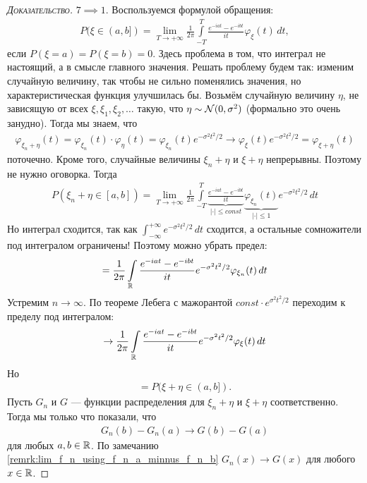 \documentclass[../main.tex]{subfiles}
\begin{document}
\begin{proof}[\normalfont\textsc{Доказательство}]
 $ 7 \implies 1 $. Воспользуемся формулой обращения:
 \begin{align*}
  P(\xi \in (a,b]) = \lim_{T \to +\infty}  \frac{1}{2\pi} \int\limits_{-T}^{T} \frac{e^{-iat} - e^{-ibt}}{it} \varphi_\xi(t)\,dt,
 \end{align*} если $ P(\xi = a) = P(\xi = b) = 0 $. Здесь проблема в том, что интеграл не настоящий, а в смысле главного значения. Решать проблему будем так: изменим случайную величину, так чтобы не сильно поменялись значения, но характеристическая функция улучшилась бы. Возьмём случайную величину $ \eta $, не зависящую от всех $ \xi, \xi_1, \xi_2, \ldots $ такую, что $ \eta \sim \mathcal N(0, \sigma^{2}) $ (формально это очень занудно). Тогда мы знаем, что
 \begin{align*}
  \varphi_{\xi_n + \eta}(t) = \varphi_{\xi_n}(t) \cdot \varphi_\eta(t) = \varphi_{\xi_n}(t) e^{-\sigma^{2}t^{2} / 2} \to \varphi_\xi(t) e^{-\sigma^{2}t^{2} / 2} = \varphi_{\xi+\eta}(t)
 \end{align*} поточечно. Кроме того, случайные величины $ \xi_n + \eta $ и   $ \xi + \eta $ непрерывны. Поэтому не нужно оговорка. Тогда
   \begin{align*}
		 P(\xi_n + \eta \in [a,b]) = \lim_{T \to +\infty}  \frac{1}{2\pi} \int\limits_{-T}^T \underbrace{\frac{e^{-iat} - e^{-ibt}}{it}}_{|\cdot| \leqslant const} \underbrace{\varphi_{\xi_n}(t)}_{|\cdot| \leqslant 1} e^{-\sigma^{2}t^{2} / 2} \,dt
	 \end{align*} Но интеграл сходится, так как $\int_{-\infty}^{+\infty} e^{-\sigma^2t^2/2}\,dt$ сходится, а остальные сомножители под интегралом ограничены! Поэтому можно убрать предел:
 \begin{align*}
	 = \frac{1}{2\pi} \int\limits_{\mathbb{R}} \frac{e^{-iat} - e^{-ibt}}{it} e^{-\sigma^{2}t^{2} / 2}\varphi_{\xi_n}(t)\,dt
 \end{align*} Устремим $ n \to \infty $. По теореме Лебега с мажорантой $const \cdot e^{\sigma^2t^2/2}$ переходим к пределу под интегралом:  
 \begin{align*}
	 \to \frac{1}{2\pi} \int\limits_{\mathbb{R}} \frac{e^{-iat}-e^{-ibt}}{it}  e^{-\sigma^{2}t^{2} / 2}\varphi_{\xi}(t)\,dt
 \end{align*} Но
 \begin{align*}
  = P(\xi+ \eta \in (a,b]).
 \end{align*} Пусть $ G_n $ и $ G $ --- функции распределения для $ \xi_n + \eta $ и $ \xi + \eta $ соответственно. Тогда мы только что показали, что
 \begin{align*}
  G_n(b) - G_n(a) \to G(b) - G(a)
 \end{align*} для любых $ a,b\in\mathbb{R} $. По замечанию \ref{remrk:lim_f_n_using_f_n_a_minnus_f_n_b} $ G_n(x) \to G(x) $ для любого $ x \in \mathbb{R} $.


\end{proof}
\end{document}
